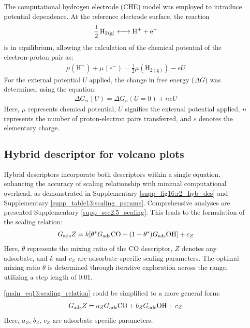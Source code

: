     The computational hydrogen electrode (CHE) model \cite{peterson2010copper, norskov2004origin} was employed to introduce potential dependence.
    At the reference electrode surface, the reaction
    \begin{align}
    \ce{1/2H2_{(g)}  <-> H+ + e-}  \label{main_eq10:che}
    \end{align}
    is in equilibrium, allowing the calculation of the chemical potential of the electron-proton pair as:
    \begin{align}
    \mu(\mathrm{H}^+) + \mu(e^-) = \frac{1}{2}\mu(\mathrm{H}_{2(\mathrm{g})}) - eU  \label{main_eq11:che_potential}
    \end{align}
    For the external potential $\textit{U}$ applied, the change in free energy ($\Delta \textit{G}$) was determined using the equation:
    \begin{align}
    \Delta G_n(U) = \Delta G_n(U=0) + neU  \label{main_eq12:ext_potential_che}
    \end{align}
    Here, $\mu$ represents chemical potential, $\textit{U}$ signifies the external potential applied, $\textit{n}$ represents the number of proton-electron pairs transferred, and $\textit{e}$ denotes the elementary charge.


    \subsection{Hybrid descriptor for volcano plots}
    Hybrid descriptors incorporate both descriptors within a single equation, enhancing the accuracy of scaling relationship with minimal computational overhead, as demonstrated in Supplementary \cref{supp_fig16:r2_hyb_des} and Supplementary \cref{supp_table13:scaling_params}.
    Comprehensive analyses are presented Supplementary \cref{supp_sec2.5_scaling}.
    This leads to the formulation of the scaling relation:
    \begin{align}
    G_{\text{ads}} Z =
    k[\theta^* G_{\text{ads}} \ce{CO} + (1-\theta^*) G_{\text{ads}} \ce{OH}] + c_Z  \label{main_eq13:scaling_relation}
    \end{align}
    Here, $\theta$ represents the mixing ratio of the CO descriptor, $\textit{Z}$ denotes any adsorbate, and $\textit{k}$ and $\textit{c}_{Z}$ are adsorbate-specific scaling parameters.
    The optimal mixing ratio $\theta$ is determined through iterative exploration across the range, utilizing a step length of 0.01.

    \ref{main_eq13:scaling_relation} could be simplified to a more general form:
    \begin{align}
    G_{\text{ads}} Z =
    a_Z G_{\text{ads}} \ce{CO} + b_Z G_{\text{ads}} \ce{OH} + c_Z  \label{main_eq14:general_scaling_relation}
    \end{align}
    Here, $a_Z$, $b_Z$, $c_Z$ are adsorbate-specific parameters.

